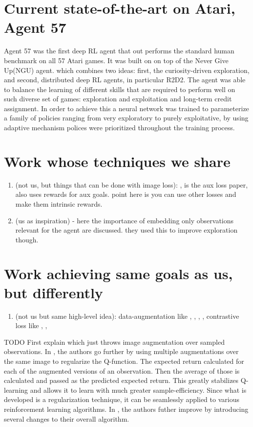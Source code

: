 \section{Current state-of-the-art on Atari, Agent 57}

Agent 57 \cite{agent57}  was the first deep RL agent that out performs 
the standard human benchmark on all 57 Atari games.
It was built on  on top of the Never Give Up(NGU) agent. 
which combines two ideas: first, 
the curiosity-driven exploration, and second, 
distributed deep RL agents, in particular R2D2.
The agent was able to balance the learning of different 
skills that are required to perform well on such diverse set of games: 
exploration and exploitation and long-term credit assignment.
In order to achieve this a neural network was trained to parameterize 
a family of policies ranging from very exploratory to purely exploitative,
by using adaptive  mechanism polices were prioritized throughout the training process.



\section{Work whose techniques we share}
\begin{enumerate}
		\item (not us, but things that can be done with image loss): \cite{lossisitsownreward}, 
				\cite{rlwauxloss} is the aux loss paper, also uses rewards for aux goals.
				point here is you can use other losses and make them intrinsic rewards.
		\item (us as inspiration) \cite{icm} - here the importance of embedding only
				observations relevant for the agent are discussed.
				they used this to improve exploration though.
\end{enumerate}


\section{Work achieving same goals as us, but differently}
\begin{enumerate}
		\item (not us but same high-level idea): data-augmentation like \cite{drqv1},
				\cite{drqv2}, \cite{rad},
\cite{imageaugmentationisallyouneed},
				contrastive loss like \cite{curl}, 
				\cite{flow}, 
				\cite{invariantrepwithoutreconstruction}
\end{enumerate}
TODO
First explain \cite{rad} which just throws image augmentation over sampled observations.
In \cite{drqv1}, the authors go further by using multiple augmentations over the same image
to regularize the Q-function. The expected return calculated for each of the augmented 
versions of an observation. Then the average of those is calculated and passed
as the predicted expected return. This greatly stabilizes Q-learning
and allows it to learn with much greater sample-efficiency.
Since what is developed is a regularization technique, it can
be seamlessly applied to various reinforcement learning algorithms.
In \cite{drqv2}, the authors futher improve \cite{drqv1} by introducing several
changes to their overall algorithm.

